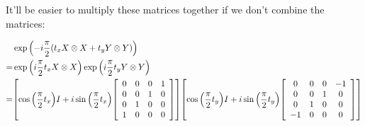 \documentclass{article}
\begin{document}
It'll be easier to multiply these matrices together if we don't combine the matrices:

\begin{align*}
  &\exp\pqty{-i\frac{\pi}{2}\pqty{t_x X\otimes X + t_y Y\otimes Y}} \\
  =& \exp\pqty{i\frac{\pi}{2}t_x X\otimes X} \exp\pqty{i\frac{\pi}{2}t_y Y\otimes Y} \\
  =&
  \bqty{
  \cos\pqty{\frac{\pi}{2}t_x} I
  +
  i\sin\pqty{\frac{\pi}{2}t_x}
  \bqty{
  \begin{array}{cccc}
    0&0&0&1 \\
    0&0&1&0 \\
    0&1&0&0 \\
    1&0&0&0 \\
  \end{array}
  }
  }
  \bqty{
  \cos\pqty{\frac{\pi}{2}t_y} I
  +
  i\sin\pqty{\frac{\pi}{2}t_y}
  \bqty{
  \begin{array}{cccc}
    0&0&0&-1 \\
    0&0&1&0 \\
    0&1&0&0 \\
    -1&0&0&0 \\
  \end{array}
  }
  }
\end{align*}
\end{document}
